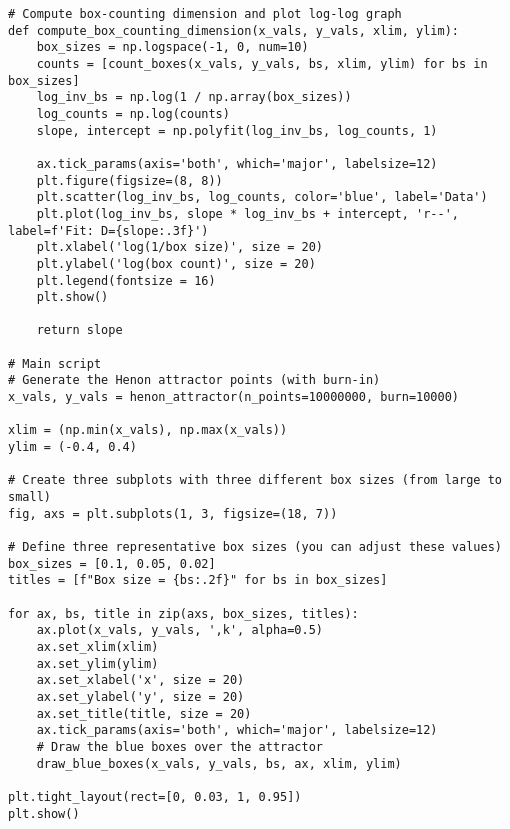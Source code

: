 \begin{lstlisting}[style=python]
# Compute box-counting dimension and plot log-log graph
def compute_box_counting_dimension(x_vals, y_vals, xlim, ylim):
    box_sizes = np.logspace(-1, 0, num=10)
    counts = [count_boxes(x_vals, y_vals, bs, xlim, ylim) for bs in box_sizes]
    log_inv_bs = np.log(1 / np.array(box_sizes))
    log_counts = np.log(counts)
    slope, intercept = np.polyfit(log_inv_bs, log_counts, 1)
    
    ax.tick_params(axis='both', which='major', labelsize=12)
    plt.figure(figsize=(8, 8))
    plt.scatter(log_inv_bs, log_counts, color='blue', label='Data')
    plt.plot(log_inv_bs, slope * log_inv_bs + intercept, 'r--', label=f'Fit: D={slope:.3f}')
    plt.xlabel('log(1/box size)', size = 20)
    plt.ylabel('log(box count)', size = 20)
    plt.legend(fontsize = 16)
    plt.show()
    
    return slope

# Main script
# Generate the Henon attractor points (with burn-in)
x_vals, y_vals = henon_attractor(n_points=10000000, burn=10000)

xlim = (np.min(x_vals), np.max(x_vals))
ylim = (-0.4, 0.4)

# Create three subplots with three different box sizes (from large to small)
fig, axs = plt.subplots(1, 3, figsize=(18, 7))

# Define three representative box sizes (you can adjust these values)
box_sizes = [0.1, 0.05, 0.02]
titles = [f"Box size = {bs:.2f}" for bs in box_sizes]

for ax, bs, title in zip(axs, box_sizes, titles):
    ax.plot(x_vals, y_vals, ',k', alpha=0.5)
    ax.set_xlim(xlim)
    ax.set_ylim(ylim)
    ax.set_xlabel('x', size = 20)
    ax.set_ylabel('y', size = 20)
    ax.set_title(title, size = 20)
    ax.tick_params(axis='both', which='major', labelsize=12)
    # Draw the blue boxes over the attractor
    draw_blue_boxes(x_vals, y_vals, bs, ax, xlim, ylim)

plt.tight_layout(rect=[0, 0.03, 1, 0.95])
plt.show()
\end{lstlisting}\label{boxalg}